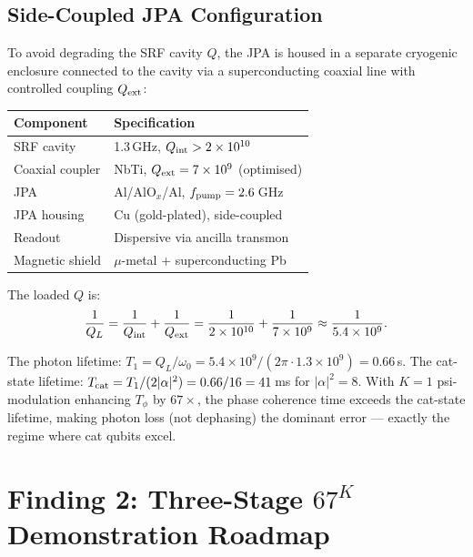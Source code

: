 \documentclass[11pt]{article}
\theoremstyle{definition}
\theoremstyle{remark}
\newcommand{\ee}[1]{\times 10^{#1}}
\begin{document}
\subsection{Side-Coupled JPA Configuration}
\label{sec:side-coupled}

To avoid degrading the SRF cavity $Q$, the JPA is housed in a separate
cryogenic enclosure connected to the cavity via a superconducting
coaxial line with controlled coupling $Q_{\rm ext}$:

\begin{center}
\begin{tabular}{@{}ll@{}}
\toprule
Component & Specification \\
\midrule
SRF cavity & 1.3\,GHz, $Q_{\rm int} > 2\ee{10}$ \\
Coaxial coupler & NbTi, $Q_{\rm ext} = 7\ee{9}$ (optimised) \\
JPA & Al/AlO$_x$/Al, $f_{\rm pump} = 2.6$\,GHz \\
JPA housing & Cu (gold-plated), side-coupled \\
Readout & Dispersive via ancilla transmon \\
Magnetic shield & $\mu$-metal + superconducting Pb \\
\bottomrule
\end{tabular}
\end{center}

The loaded $Q$ is:
\begin{equation}
  \frac{1}{Q_L} = \frac{1}{Q_{\rm int}} + \frac{1}{Q_{\rm ext}}
  = \frac{1}{2\ee{10}} + \frac{1}{7\ee{9}}
  \approx \frac{1}{5.4\ee{9}}.
\end{equation}

The photon lifetime: $T_1 = Q_L / \omega_0 = 5.4\ee{9}/(2\pi \cdot
1.3\ee{9}) = 0.66$\,s.  The cat-state lifetime:
$T_{\rm cat} = T_1/(2|\alpha|^2) = 0.66/16 = 41$\,ms for
$|\alpha|^2 = 8$.  With $K=1$ psi-modulation enhancing $T_\phi$ by
$67\times$, the phase coherence time exceeds the cat-state lifetime,
making photon loss (not dephasing) the dominant error --- exactly the
regime where cat qubits excel.

\section{Finding 2: Three-Stage $67^K$ Demonstration Roadmap}
\label{sec:roadmap}
\end{document}

